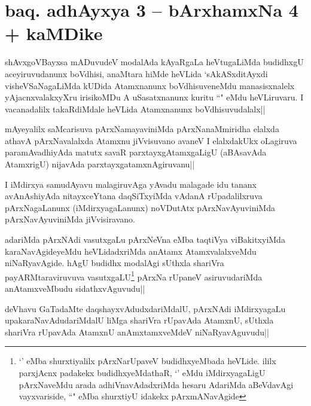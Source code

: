 \section*{baq. adhAyxya 3 -- bArxhamxNa 4 + kaMDike}

\stext

\begin{artha}
shAvxgoVBayxsa mADuvudeV modalAda kAyaRgaLa heVtugaLiMda budidhxgU aceyiruvudanunx boVdhisi, anaMtara hiMde heVLida `sAkASxditAyxdi visheVSaNagaLiMda kUDida Atamxnanunx boVdhisuveneMdu manasisxnalelx yAjacnxvalakxyXru irisikoMDu A uSasatxnanunx kuritu ``\stext" eMdu heVLiruvaru. I vacanadalilx takaRdiMdale heVLida Atamxnanunx boVdhisuvudalalx||
\end{artha}%


\begin{artha}
mAyeyalilx saMcarisuva pArxNamayaviniMda pArxNanaMmiridha elalxda athavA pArxNavalalxda Atamxnu jiVvisuvano avaneV I elalxdakUkx oLagiruva paramAvadhiyAda matutx savaR parxtayxgAtamxgaLigU (aBAsavAda AtamxrigU) nijavAda parxtayxgatamxnAgiruvanu||
\end{artha}

\begin{artha}
I iMdirxya samudAyavu malagiruvAga yAvadu malagade idu tananx avAnAshiyAda nitayxceYtana daqSiTxyiMda vAdanA rUpadalilxruva pArxNagaLanunx (iMdirxyagaLanunx) noVDutAtx pArxNavAyuviniMda pArxNavAyuviniMda jiVvisiravano.
\end{artha}

\begin{artha}
adariMda pArxNAdi vasutxgaLu pArxNeVna eMba taqtiVya viBakitxyiMda karaNavAgideyeMdu heVLidadxriMda anAtamx AtamxvalalxveMdu niNaRyavAgide. hAgU budidhx modalAgi sUthxla shariVra payARMtaraviruvuva vasutxgaLU\footnote[1]{`\stext ' eMba shurxtiyalilx pArxNarUpaveV budidhxyeMbada heVLide. ililx parxjAcnx padakekx budidhxyeMdathaR, `\stext ' eMdu iMdirxyagaLigU pArxNaveMdu arada adhiVnavAdadxriMda hesaru AdariMda aBeVdavAgi vayxvariside, ``\stext " eMba shurxtiyU idakekx pArxmANavAgide} pArxNa rUpaneV asiruvudariMda anAtamxveMbudu sidathxvAguvudu||
\end{artha}%

\begin{artha}
deVhavu GaTadaMte daqshayxvAdudxdariMdalU, pArxNAdi iMdirxyagaLu upakaraNavAdudariMdalU liMga shariVra rUpavAda AtamxnU, sUthxla shariVra rUpavAda AtamxnU anAmxtamxveMdeV niNaRyavAguvudu||
\end{artha}


